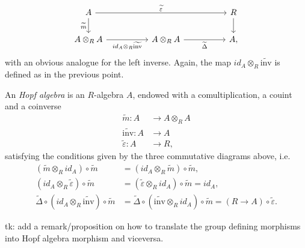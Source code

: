 \documentclass[../Main]{subfiles}
\begin{document}
\begin{rem}[]
\begin{enumerate}
			\begin{equation}
			\begin{tikzcd}[column sep=5em]
				A \arrow[rr, "\widetilde{\varepsilon}", rightarrow] 
				\arrow[d, "\widetilde{m}"', rightarrow] & &
				R \arrow[d, "", rightarrow] \\
				A \otimes_R A 
				\arrow[r, "id_A \otimes_R \widetilde{\mathrm{inv}}"', rightarrow] &
				A \otimes_R A \arrow[r, "\widetilde{\Delta}"', rightarrow] &
				A,
			\end{tikzcd}
			\end{equation} 
			with an obvious analogue for the left inverse.
			Again, the map $id_A \otimes_R \widetilde{\mathrm{inv}}$
			is defined as in the previous point.
	\end{enumerate}
\end{rem}

\begin{defn}
	An {\em Hopf algebra} is an $R$-algebra $A$,
	endowed with a comultiplication, a couint and a coinverse
	\begin{align}
		\widetilde{m}\colon A &\longrightarrow A \otimes_R A \\
		\widetilde{\mathrm{inv}}\colon A &\longrightarrow A \nonumber\\
		\widetilde{\varepsilon}\colon A &\longrightarrow R \nonumber
	,\end{align} 
	satisfying the conditions given by the three commutative diagrams above, i.e.
	\begin{align}
		( \widetilde{m} \otimes_R id_A ) \circ \widetilde{m} &=
		( id_A \otimes_R \widetilde{m} ) \circ \widetilde{m},\\
		( id_A \otimes_R \widetilde{\varepsilon} ) \circ \widetilde{m} &=
		( \widetilde{\varepsilon} \otimes_R id_A ) \circ \widetilde{m} =
		id_A,\\
		\widetilde{\Delta} \circ ( id_A \otimes_R \widetilde{\mathrm{inv}} ) 
		\circ \widetilde{m} &=
		\widetilde{\Delta} \circ ( \widetilde{\mathrm{inv}} \otimes_R id_A ) 
		\circ \widetilde{m} =
		(R \to A) \circ \widetilde{\varepsilon}
	.\end{align} 
\end{defn}

\begin{rem}[]
	tk: add a remark/proposition on how to translate the group defining morphisms
	into Hopf algebra morphism and viceversa.
\end{rem}
\end{document}
